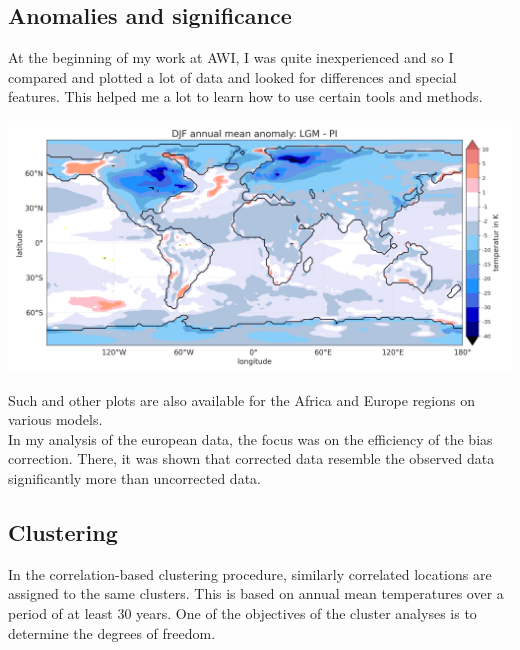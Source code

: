 \documentclass[a0,portrait]{a0poster}
\begin{document}
\begin{multicols}{3}

\color{Black} %
\subsection{Anomalies and significance}
At the beginning of my work at AWI, I was quite inexperienced and so I compared and plotted a lot of data and looked for differences and special features. This helped me a lot to learn how to use certain tools and methods.
\begin{center}\vspace{1cm}
\includegraphics[width=1\linewidth]{lgmpisig.png}
\label{fig:lgmpisig}
\end{center}\vspace{1cm}

Such and other plots are also available for the Africa and Europe regions on various models.\\
In my analysis of the european data, the focus was on the efficiency of the bias correction. There, it was shown that corrected data resemble the observed data significantly more than uncorrected data.


\color{Black} %

\subsection{Clustering}
In the correlation-based clustering procedure, similarly correlated locations are assigned to the same clusters. This is based on annual mean temperatures over a period of at least 30 years. One of the objectives of the cluster analyses is to determine the degrees of freedom.


\end{multicols}
\end{document}
